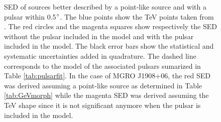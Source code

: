 \begin{figure}[h!]
{\label{fig:mgroj2228}
}
\caption{\label{fig:sedsourcespuls}SED of sources better described by a point-like source and with a pulsar within 0.5$\mbox{$^\circ$}$. The blue points show the TeV points taken from \cite{2011AA...528A.143H, 2009ApJ...700L.127A, 2009AA...499..723A, 2007ApJ...664L..91A, 2009ApJ...700L.127A, 2011arXiv1111.2591M}. The red circles and the magenta squares show respectively the SED without the pulsar included in the model and with the pulsar included in the model. The black error bars show the statistical and   systematic uncertainties added in quadrature. The dashed line corresponds to the model of the associated pulsars sumarized in Table \ref{tab:pulsarfit}. In the case of MGRO J1908+06, the red SED was derived assuming a point-like source as determined in Table \ref{tab:GeVmorph} while the magenta SED was derived assuming the TeV shape since it is not significant anymore when the pulsar is included in the model.}
\end{figure}

